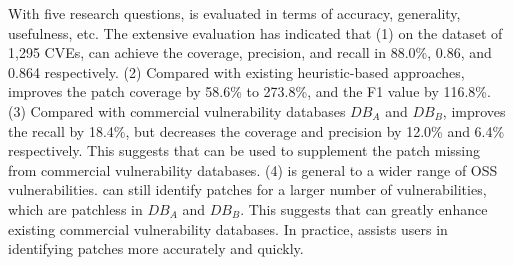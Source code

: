 \begin{abstract*}
With five research questions, \tool is evaluated in terms of accuracy, generality, usefulness, etc. The extensive evaluation has indicated that (1) on the dataset of 1,295 CVEs, \tool can achieve the coverage, precision, and recall in 88.0\%, 0.86, and 0.864 respectively. (2) Compared with existing heuristic-based approaches, \tool improves the patch coverage by 58.6\% to 273.8\%, and the F1 value by 116.8\%. (3) Compared with commercial vulnerability databases $DB_A$ and $DB_B$, \tool improves the recall by 18.4\%, but decreases the coverage and precision by 12.0\% and 6.4\% respectively. This suggests that \tool can be used to supplement the patch missing from commercial vulnerability databases. (4) \tool is general to a wider range of OSS vulnerabilities. \tool can still identify patches for a larger number of vulnerabilities, which are patchless in $DB_A$ and $DB_B$. This suggests that \tool can greatly enhance existing commercial vulnerability databases. In practice, \tool assists users in identifying patches more accurately and quickly.
\end{abstract*}